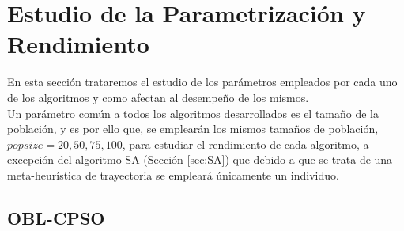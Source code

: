 \newpage
 
\section{Estudio de la Parametrización y Rendimiento}\label{sec:PARAM}

En esta sección trataremos el estudio de los parámetros empleados por cada uno de los algoritmos y como afectan al desempeño de los mismos. \\

Un parámetro común a todos los algoritmos desarrollados es el tamaño de la población, y es por ello que, se emplearán los mismos tamaños de población, $popsize = 20, 50, 75, 100$, para estudiar el rendimiento de cada algoritmo, a excepción del algoritmo SA (Sección \ref{sec:SA}) que debido a que se trata de una meta-heurística de trayectoria se empleará únicamente un individuo.

\subsection{OBL-CPSO}\label{sec:paramOBL_CPSO}

